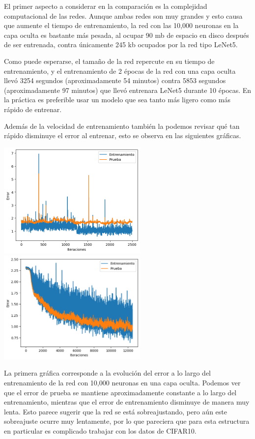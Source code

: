 \documentclass{article}
\begin{document}
\begin{enumerate}
\begin{itemize}
        El primer aspecto a considerar en la comparación es la complejidad computacional
        de las redes. Aunque ambas redes son muy grandes y esto causa que aumente el tiempo
        de entrenamiento, la red con las 10,000 neuronas en la capa oculta es bastante más
        pesada, al ocupar 90 mb de espacio en disco después de ser entrenada, contra únicamente
        245 kb ocupados por la red tipo LeNet5. 
        
        Como puede esperarse, el tamaño de la red repercute en su tiempo de entrenamiento,
        y el entrenamiento de 2 épocas de la red con una capa oculta llevó 3254 segundos 
        (aproximadamente 54 minutos) contra 5853 segundos (aproximadamente 97 minutos)
        que llevó entrenara LeNet5 durante 10 épocas. En la práctica es preferible usar un
        modelo que sea tanto más ligero como más rápido de entrenar.

        Además de la velocidad de entrenamiento también la podemos revisar qué tan rápido
        disminuye el error al entrenar, esto se observa en las siguientes gráficas.

        \begin{center}
        \includegraphics[width=0.55\textwidth]{./Tarea11/evo1.png}
        \includegraphics[width=0.55\textwidth]{./Tarea11/evo2.png}
        \end{center}

        La primera gráfica corresponde a la evolución del error a lo largo del entrenamiento
        de la red con 10,000 neuronas en una capa oculta. Podemos ver que el error de prueba
        se mantiene aproximadamente constante a lo largo del entrenamiento, mientras que 
        el error de entrenamiento disminuye de manera muy lenta. Esto parece sugerir
        que la red se está sobreajustando, pero aún este sobreajuste ocurre muy lentamente,
        por lo que pareciera que para esta estructura en particular es complicado
        trabajar con los datos de CIFAR10.


\end{itemize}
\end{enumerate}
\end{document}
